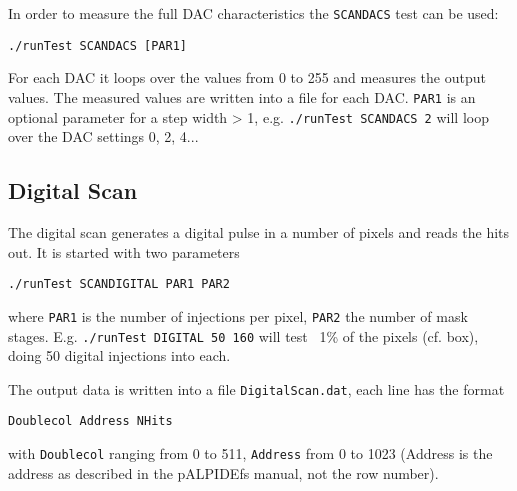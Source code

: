 \documentclass{article}
\begin{document}
In order to measure the full DAC characteristics the \texttt{SCANDACS}
test can be used: 
\begin{verbatim}
./runTest SCANDACS [PAR1]
\end{verbatim}
For each DAC it loops over the values from 0 to 255 and measures the
output values. The measured values are written into a file for each
DAC. \texttt{PAR1} is an optional parameter for a step width > 1, e.g. \texttt{./runTest SCANDACS 2} will loop over the DAC settings 0, 2, 4...


\subsection{Digital Scan} 
The digital scan generates a digital pulse in a number of pixels and
reads the hits out. It is started with two parameters
\begin{verbatim}
./runTest SCANDIGITAL PAR1 PAR2
\end{verbatim}
where \texttt{PAR1} is the number of injections per pixel,
\texttt{PAR2} the number of mask stages. E.g. \texttt{./runTest
  DIGITAL 50 160} will test ~1\% of the pixels (cf. box), doing 50
digital injections into each.

The output data is written into a file \texttt{DigitalScan.dat}, each
line has the format 
\begin{verbatim}
Doublecol Address NHits
\end{verbatim}

with \texttt{Doublecol} ranging from 0 to 511, \texttt{Address} from 0
to 1023 (Address is the address as described in the pALPIDEfs manual,
not the row number).
\vspace{0.5 cm}


\end{document}
